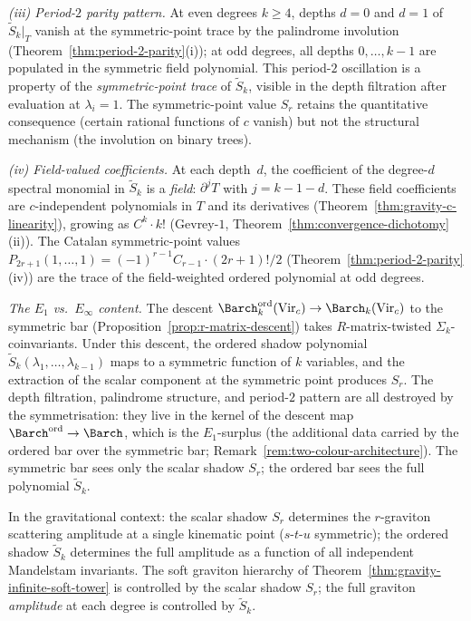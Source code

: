 \begin{remark}
\textit{(iii) Period-$2$ parity pattern.}
At even degrees $k \ge 4$, depths $d = 0$ and $d = 1$ of
$\widetilde{S}_k|_T$ vanish at the symmetric-point trace by the
palindrome involution
(Theorem~\ref{thm:period-2-parity}(i)); at odd degrees, all
depths \(0,\ldots,k-1\) are populated in the symmetric field
polynomial. This period-$2$ oscillation is a
property of the \emph{symmetric-point trace} of
$\widetilde{S}_k$, visible in the depth filtration after
evaluation at \(\lambda_i=1\). The
symmetric-point value $S_r$ retains the quantitative consequence
(certain rational functions of $c$ vanish) but not the structural
mechanism (the involution on binary trees).

\textit{(iv) Field-valued coefficients.}
At each depth~$d$, the coefficient of the degree-$d$ spectral
monomial in $\widetilde{S}_k$ is a \emph{field}: $\partial^j T$
with $j = k - 1 - d$. These field coefficients are
$c$-independent polynomials in $T$ and its derivatives
(Theorem~\ref{thm:gravity-c-linearity}), growing as
$C^k \cdot k!$ (Gevrey-$1$, Theorem~\ref{thm:convergence-dichotomy}(ii)).
The Catalan symmetric-point values
$P_{2r+1}(1, \ldots, 1) = (-1)^{r-1} C_{r-1} \cdot (2r+1)!/2$
(Theorem~\ref{thm:period-2-parity}(iv)) are the trace of the
field-weighted ordered polynomial at odd degrees.

\textit{The $E_1$ vs.\ $E_\infty$ content.}
The descent ${\Barch}^{\mathrm{ord}}_k(\mathrm{Vir}_c) \to
\Barch_k(\mathrm{Vir}_c)$ to the symmetric bar
(Proposition~\ref{prop:r-matrix-descent})
takes $R$-matrix-twisted $\Sigma_k$-coinvariants.
Under this descent, the ordered shadow polynomial
$\widetilde{S}_k(\lambda_1, \ldots, \lambda_{k-1})$ maps to a
symmetric function of $k$ variables, and the
extraction of the scalar component at the symmetric point
produces $S_r$. The depth filtration, palindrome structure,
and period-$2$ pattern are all destroyed by the
symmetrisation: they live in the kernel of the descent map
${\Barch}^{\mathrm{ord}} \to \Barch$, which is the
$E_1$-surplus (the additional data carried by the ordered bar
over the symmetric bar;
Remark~\ref{rem:two-colour-architecture}). The
symmetric bar sees only the scalar shadow $S_r$; the ordered bar
sees the full polynomial $\widetilde{S}_k$.

In the gravitational context: the scalar shadow $S_r$
determines the $r$-graviton scattering amplitude at a single
kinematic point ($s$-$t$-$u$ symmetric); the ordered shadow
$\widetilde{S}_k$ determines the full amplitude as a function
of all independent Mandelstam invariants. The soft graviton
hierarchy of
Theorem~\ref{thm:gravity-infinite-soft-tower} is controlled
by the scalar shadow $S_r$; the full graviton
\emph{amplitude} at each degree is controlled by
$\widetilde{S}_k$.
\end{remark}

